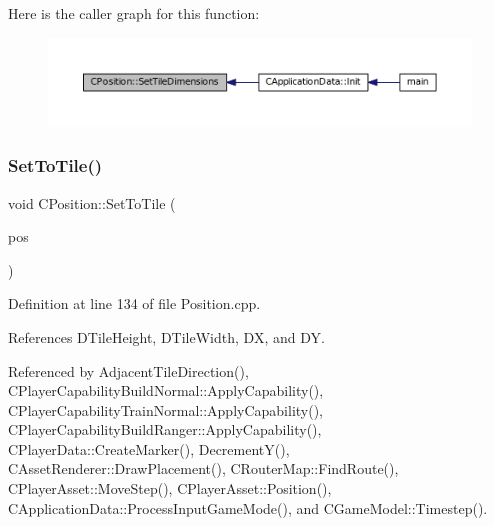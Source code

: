 Here is the caller graph for this function\+:\nopagebreak
\begin{figure}[H]
\begin{center}
\leavevmode
\includegraphics[width=350pt]{classCPosition_a506e9efd21e209e36533ba7e594be75f_icgraph}
\end{center}
\end{figure}
\hypertarget{classCPosition_ae302aa21792de64c97de29e2cbbfeb94}{}\label{classCPosition_ae302aa21792de64c97de29e2cbbfeb94} 
\subsubsection{\texorpdfstring{Set\+To\+Tile()}{SetToTile()}}
{\footnotesize\ttfamily void C\+Position\+::\+Set\+To\+Tile (\begin{DoxyParamCaption}\item[{const \hyperlink{classCPosition}{C\+Position} \&}]{pos }\end{DoxyParamCaption})}



Definition at line 134 of file Position.\+cpp.



References D\+Tile\+Height, D\+Tile\+Width, DX, and DY.



Referenced by Adjacent\+Tile\+Direction(), C\+Player\+Capability\+Build\+Normal\+::\+Apply\+Capability(), C\+Player\+Capability\+Train\+Normal\+::\+Apply\+Capability(), C\+Player\+Capability\+Build\+Ranger\+::\+Apply\+Capability(), C\+Player\+Data\+::\+Create\+Marker(), Decrement\+Y(), C\+Asset\+Renderer\+::\+Draw\+Placement(), C\+Router\+Map\+::\+Find\+Route(), C\+Player\+Asset\+::\+Move\+Step(), C\+Player\+Asset\+::\+Position(), C\+Application\+Data\+::\+Process\+Input\+Game\+Mode(), and C\+Game\+Model\+::\+Timestep().



